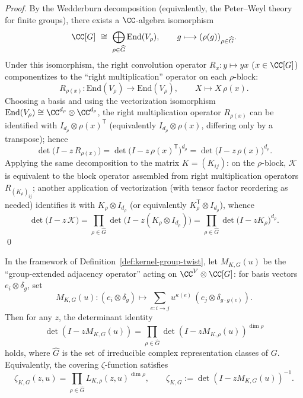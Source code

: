 \begin{proof}
By the Wedderburn decomposition (equivalently, the Peter--Weyl theory for finite groups), there exists a \(\CC\)-algebra isomorphism
\[
\CC[G]\ \cong\ \bigoplus_{\rho\in\widehat G}\mathrm{End}(V_\rho),
\qquad
g\longmapsto (\rho(g))_{\rho\in\widehat G}.
\]
Under this isomorphism, the right convolution operator \(R_x:y\mapsto yx\) (\(x\in\CC[G]\)) componentizes to the ``right multiplication'' operator on each \(\rho\)-block:
\[
R_{\rho(x)}:\mathrm{End}(V_\rho)\to\mathrm{End}(V_\rho),\qquad X\longmapsto X\,\rho(x).
\]
Choosing a basis and using the vectorization isomorphism \(\mathrm{End}(V_\rho)\cong \CC^{d_\rho}\otimes\CC^{d_\rho}\), the right multiplication operator \(R_{\rho(x)}\) can be identified with \(I_{d_\rho}\otimes \rho(x)^{\mathsf T}\) (equivalently \(I_{d_\rho}\otimes\rho(x)\), differing only by a transpose); hence
\[
\det\!\bigl(I-z\,R_{\rho(x)}\bigr)
=\det\!\bigl(I-z\,\rho(x)^{\mathsf T}\bigr)^{d_\rho}
=\det\!\bigl(I-z\,\rho(x)\bigr)^{d_\rho}.
\]
Applying the same decomposition to the matrix \(K=(K_{ij})\): on the \(\rho\)-block, \(\mathcal{K}\) is equivalent to the block operator assembled from right multiplication operators \(R_{(K_\rho)_{ij}}\); another application of vectorization (with tensor factor reordering as needed) identifies it with \(K_\rho\otimes I_{d_\rho}\) (or equivalently \(K_\rho^{\mathsf T}\otimes I_{d_\rho}\)), whence
\[
\det\!\bigl(I-z\,\mathcal{K}\bigr)
=\prod_{\rho\in\widehat G}\det\!\bigl(I-z(K_\rho\otimes I_{d_\rho})\bigr)
=\prod_{\rho\in\widehat G}\det\!\bigl(I-zK_\rho\bigr)^{d_\rho}.
\]
\qed
\end{proof}

\begin{proposition}\label{prop:kernel-artin-factorization}
In the framework of Definition~\ref{def:kernel-group-twist}, let $M_{K,G}(u)$ be the ``group-extended adjacency operator'' acting on $\CC^{V}\otimes\CC[G]$:
for basis vectors $e_{i}\otimes\delta_g$, set
\[
M_{K,G}(u):(e_i\otimes\delta_g)\mapsto \sum_{e:i\to j}u^{\kappa(e)}\,(e_j\otimes \delta_{g\cdot g(e)}).
\]
Then for any $z$, the determinant identity
\[
\det(I-zM_{K,G}(u))=\prod_{\rho\in\widehat G}\det(I-zM_{K,\rho}(u))^{\dim\rho}
\]
holds, where $\widehat G$ is the set of irreducible complex representation classes of $G$. Equivalently, the covering $\zeta$-function satisfies
\[
\zeta_{K,G}(z,u)=\prod_{\rho\in\widehat G}L_{K,\rho}(z,u)^{\dim\rho},
\qquad
\zeta_{K,G}:=\det(I-zM_{K,G}(u))^{-1}.
\]
\end{proposition}

